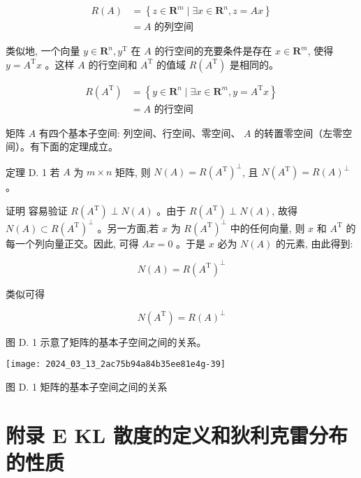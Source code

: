 \documentclass[10pt]{article}
\begin{document}
\begin{align*}
R(A) & =\left\{z \in \boldsymbol{R}^{m} \mid \exists x \in \boldsymbol{R}^{n}, z=A x\right\} \\
& =A \text { 的列空间 } \tag{D.3}
\end{align*}


类似地, 一个向量 $y \in \boldsymbol{R}^{n}, y^{\mathrm{T}}$ 在 $A$ 的行空间的充要条件是存在 $x \in \boldsymbol{R}^{m}$, 使得 $y=A^{\mathrm{T}} x$ 。这样 $A$ 的行空间和 $A^{\mathrm{T}}$ 的值域 $R\left(A^{\mathrm{T}}\right)$ 是相同的。


\begin{align*}
R\left(A^{\mathrm{T}}\right) & =\left\{y \in \boldsymbol{R}^{n} \mid \exists x \in \boldsymbol{R}^{m}, y=A^{\mathrm{T}} x\right\} \\
& =A \text { 的行空间 } \tag{D.4}
\end{align*}


矩阵 $A$ 有四个基本子空间: 列空间、行空间、零空间、 $A$ 的转置零空间（左零空间）。有下面的定理成立。

定理 D. 1 若 $A$ 为 $m \times n$ 矩阵, 则 $N(A)=R\left(A^{\mathrm{T}}\right)^{\perp}$, 且 $N\left(A^{\mathrm{T}}\right)=R(A)^{\perp}$ 。

证明 容易验证 $R\left(A^{\mathrm{T}}\right) \perp N(A)$ 。由于 $R\left(A^{\mathrm{T}}\right) \perp N(A)$, 故得 $N(A) \subset R\left(A^{\mathrm{T}}\right)^{\perp}$ 。另一方面,若 $x$ 为 $R\left(A^{\mathrm{T}}\right)^{\perp}$ 中的任何向量, 则 $x$ 和 $A^{\mathrm{T}}$ 的每一个列向量正交。因此, 可得 $A x=0$ 。于是 $x$ 必为 $N(A)$ 的元素, 由此得到:


\begin{equation*}
N(A)=R\left(A^{\mathrm{T}}\right)^{\perp} \tag{D.5}
\end{equation*}


类似可得


\begin{equation*}
N\left(A^{\mathrm{T}}\right)=R(A)^{\perp} \tag{D.6}
\end{equation*}


图 D. 1 示意了矩阵的基本子空间之间的关系。

\begin{center}
\texttt{[image: 2024\_03\_13\_2ac75b94a84b35ee81e4g-39]}
\end{center}

图 D. 1 矩阵的基本子空间之间的关系

\section*{附录 E KL 散度的定义和狄利克雷分布的性质}
\end{document}

